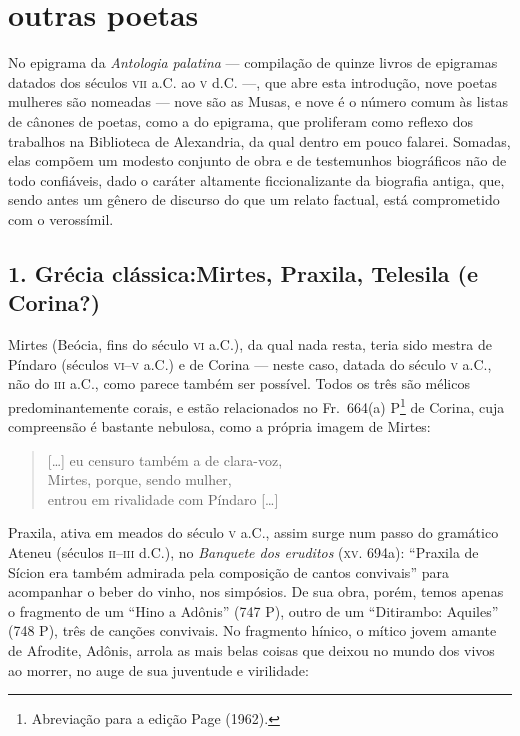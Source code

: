\section*{outras poetas}

No epigrama da \textit{Antologia palatina} --- compilação de quinze livros de
epigramas datados dos séculos \textsc{vii} a.C. ao \textsc{v} d.C. ---, que abre esta introdução,
nove poetas mulheres são nomeadas --- nove são as Musas, e nove é o número comum
às listas de cânones de poetas, como a do epigrama, que proliferam como reflexo
dos trabalhos na Biblioteca de Alexandria, da qual dentro em pouco falarei.
Somadas, elas compõem um modesto conjunto de obra e de testemunhos biográficos
não de todo confiáveis, dado o caráter altamente ficcionalizante da
biografia antiga, que, sendo antes um gênero de discurso do que um relato
factual, está comprometido com o verossímil.

\subsection*{1. Grécia clássica:\break Mirtes, Praxila, Telesila (e
Corina?)}

\smallskip

Mirtes (Beócia, fins do século \textsc{vi} a.C.), da qual nada resta, teria sido mestra
de Píndaro (séculos \textsc{vi}--\textsc{v} a.C.) e de Corina --- neste caso, datada do século \textsc{v}
a.C., não do \textsc{iii} a.C., como parece também ser possível. Todos os três são
mélicos predominantemente corais, e estão relacionados no Fr.~664(a)
P\footnote{ Abreviação para a edição Page (1962).}  de Corina, cuja compreensão
é bastante nebulosa, como a própria imagem de Mirtes:


\begin{quote}
\mbox[\ldots{}] eu censuro também a de clara-voz,\\
Mirtes, porque, sendo mulher,\\
entrou em rivalidade com Píndaro [\ldots{}]
\end{quote}

Praxila, ativa em meados do século \textsc{v} a.C., assim surge num passo do gramático
Ateneu (séculos \textsc{ii}--\textsc{iii} d.C.), no \textit{Banquete dos eruditos} (\textsc{xv}. 694a):
``Praxila de Sícion era também admirada pela composição de cantos
convivais” para acompanhar o beber do vinho, nos simpósios. De sua obra,
porém, temos apenas o fragmento de um “Hino a Adônis” (747 P), outro
de um “Ditirambo: Aquiles” (748 P), três de canções convivais. No fragmento
hínico, o mítico jovem amante de Afrodite, Adônis, arrola as mais belas coisas
que deixou no mundo dos vivos ao morrer, no auge de sua juventude e virilidade:

